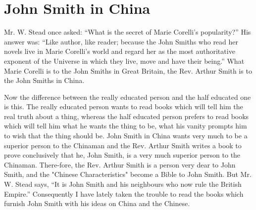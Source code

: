 
\chapter[John Smith in China]
{John Smith in China}


Mr. W. Stead once asked: ``What is the secret of Marie Corelli's popularity?''
His answer was: ``Like author, like reader; because the John Smiths who read her novels live in Marie Corelli's world and regard her as the most authoritative exponent of the Universe in which they live, move and have their being.''
What Marie Corelli is to the John Smiths in Great Britain,
the Rev. Arthur Smith is to the John Smiths in China.

Now the difference between the really educated person and the half educated one is this.
The really educated person wants to read books which will tell him the real truth about a thing,
whereas the half educated person prefers to read books which will tell him
what he wants the thing to be,
what his vanity prompts him to wish that the thing should be.
John Smith in China wants very much to be a superior person to the Chinaman
and the Rev. Arthur Smith writes a book to prove conclusively that he, John Smith,
is a very much superior person to the Chinaman.
There-fore, the Rev. Arthur Smith is a person very dear to John Smith,
and the "Chinese Characteristics" become a Bible to John Smith.
But Mr. W. Stead says, ``It is John Smith and his neighbours who now rule the British Empire.''
Consequently I have lately taken the trouble to read the books
which furnish John Smith with his ideas on China and the Chinese.

